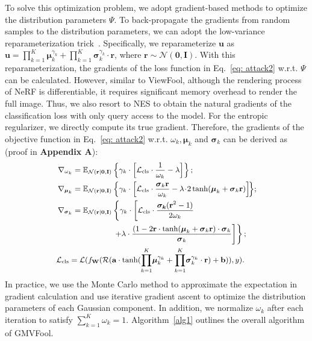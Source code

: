 \documentclass[10pt,journal,compsoc]{IEEEtran}
\begin{document}
To solve this optimization problem, we adopt gradient-based methods to optimize the distribution parameters $\Psi$.
To back-propagate the gradients from random samples to the distribution parameters, we can adopt the low-variance reparameterization trick~\cite{kingma2013auto}. Specifically, we reparameterize $\mathbf{u}$ as 
$\mathbf{u} =  {\prod_{k=1}^{K}}\boldsymbol{\mu}^{\gamma_k}_k+{ \prod_{k=1}^{K}}\boldsymbol{\sigma}^{\gamma_k}_k\cdot\mathbf{r}$, where $\mathbf{r}\sim \mathcal{N}(\mathbf{0},\mathbf{I})$. 
With this reparameterization, the gradients of the loss function in Eq.~\eqref{eq: attack2} w.r.t. $\Psi$ can be calculated. However, similar to ViewFool, although the rendering process of NeRF is differentiable, it requires significant memory overhead to render the full image. Thus, we also resort to NES to obtain the natural gradients of the classification loss with only query access to the model. For the entropic regularizer, we directly compute its true gradient. Therefore, the gradients of the objective function in Eq.~\eqref{eq: attack2} w.r.t. $\omega_k, \boldsymbol{\mu}_k$ and $\boldsymbol{\sigma}_k$ can be derived as (proof in \textbf{Appendix A}):
\begin{equation}\small
    \begin{split}
    \nabla_{\omega_k} = \mathbb{E}_{\mathcal{N}(\mathbf{r}|\mathbf{0},\mathbf{I})} & \left \{   \gamma_k \cdot \left [\mathcal{L}_\text{cls} \cdot \frac{1}{\omega _k} - \lambda \right ]\right \}; \\
    \nabla_{\boldsymbol{\mu}_k} = \mathbb{E}_{\mathcal{N}(\mathbf{r}|\mathbf{0},\mathbf{I})}& \left \{\gamma _k \cdot \left [\mathcal{L}_\text{cls} \cdot \frac{\boldsymbol{\sigma}_k \mathbf{r} }{\omega _k} - \lambda \!\cdot\! 2 \tanh(\boldsymbol{\mu} _k+\boldsymbol{\sigma}_k \mathbf{r}  )\right]\!\right \}\!; \\
    \nabla_{\boldsymbol{\sigma}_k} = \mathbb{E}_{\mathcal{N}(\mathbf{r}|\mathbf{0},\mathbf{I})}&\left \{\gamma _k \cdot \left [\mathcal{L}_\text{cls} \cdot \frac{\boldsymbol{\sigma_k} (\mathbf{r}^2-1) }{2\omega_k} \right.\right.\\
    &\left.\left. + \lambda \cdot \frac{(1-2\mathbf{r}\cdot \tanh(\boldsymbol{\mu} _k+\boldsymbol{\sigma}_k \mathbf{r}  )\cdot{\boldsymbol{\sigma}_k}  }{\boldsymbol{\sigma}_k} \right] \right \}; \\
    \mathcal{L}_\text{cls} = \mathcal{L}(f_\mathbf{W}(\mathcal{R}(&\mathbf{a} \cdot \tanh({\prod_{k=1}^{K}}\boldsymbol{\mu}^{\gamma_k}_k+{ \prod_{k=1}^{K}}\boldsymbol{\sigma}^{\gamma_k}_k\cdot\mathbf{r})+\mathbf{b})),y).
    \end{split}
    \label{eq: 12}
\end{equation}
In practice, we use the Monte Carlo method to approximate the expectation in gradient calculation and use iterative gradient ascent to optimize the distribution parameters of each Gaussian component. In addition, we normalize $\omega_k$ after each iteration to satisfy $ {\textstyle \sum_{k=1}^{K}} \omega_k=1$. Algorithm~\ref{alg1} outlines the overall algorithm of GMVFool.
\end{document}
